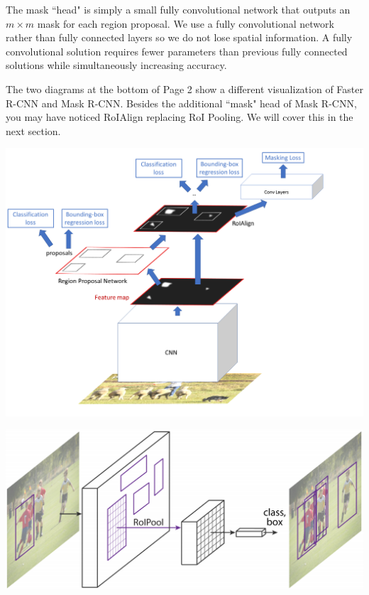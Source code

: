 \documentclass{article}
\begin{document}
The mask ``head" is simply a small fully convolutional network that outputs an $m\times m$ mask for each region proposal. We use a fully convolutional network rather than fully connected layers so we do not lose spatial information. A fully convolutional solution requires fewer parameters than previous fully connected solutions while simultaneously increasing accuracy.

The two diagrams at the bottom of Page 2 show a different visualization of Faster R-CNN and Mask R-CNN. Besides the additional ``mask" head of Mask R-CNN, you may have noticed RoIAlign replacing RoI Pooling. We will cover this in the next section.

\begin{center}
\includegraphics[scale=0.36]{masknetwork.png}
\end{center}

\begin{center}
\includegraphics[scale=0.45]{fasterrcnn.PNG}
\end{center}
\end{document}
